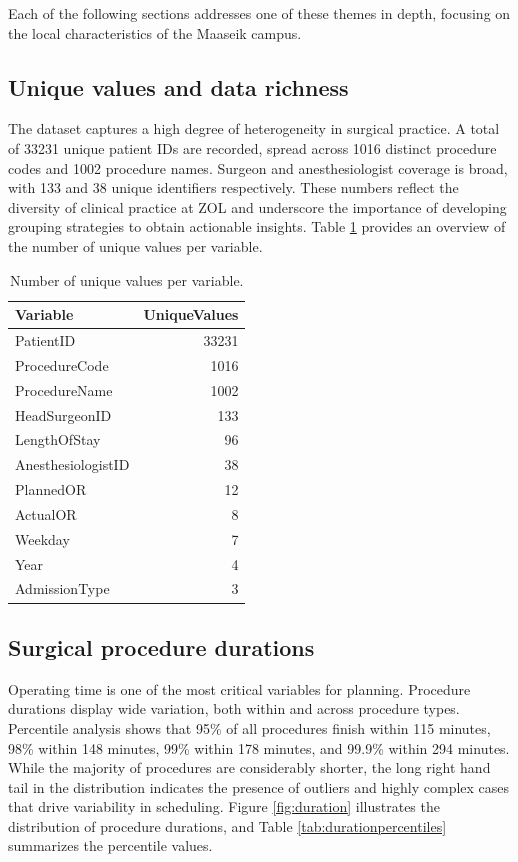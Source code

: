 \documentclass[
]{article}
\begin{document}
Each of the following sections addresses one of these themes in depth,
focusing on the local characteristics of the Maaseik campus.

\subsection{Unique values and data
richness}\label{unique-values-and-data-richness}

The dataset captures a high degree of heterogeneity in surgical
practice. A total of 33231 unique patient IDs are recorded, spread
across 1016 distinct procedure codes and 1002 procedure names. Surgeon
and anesthesiologist coverage is broad, with 133 and 38 unique
identifiers respectively. These numbers reflect the diversity of
clinical practice at ZOL and underscore the importance of developing
grouping strategies to obtain actionable insights. Table
\ref{tab:uniquevalues} provides an overview of the number of unique
values per variable.

\begin{table}[H]

\caption{\label{tab:unique values}Number of unique values per variable. \label{tab:uniquevalues}}
\centering
\begin{tabular}[t]{lr}
\toprule
Variable & UniqueValues\\
\midrule
PatientID & 33231\\
ProcedureCode & 1016\\
ProcedureName & 1002\\
HeadSurgeonID & 133\\
LengthOfStay & 96\\
\addlinespace
AnesthesiologistID & 38\\
PlannedOR & 12\\
ActualOR & 8\\
Weekday & 7\\
Year & 4\\
\addlinespace
AdmissionType & 3\\
\bottomrule
\end{tabular}
\end{table}

\subsection{Surgical procedure
durations}\label{surgical-procedure-durations}

Operating time is one of the most critical variables for planning.
Procedure durations display wide variation, both within and across
procedure types. Percentile analysis shows that 95\% of all procedures
finish within 115 minutes, 98\% within 148 minutes, 99\% within 178
minutes, and 99.9\% within 294 minutes. While the majority of procedures
are considerably shorter, the long right hand tail in the distribution
indicates the presence of outliers and highly complex cases that drive
variability in scheduling. Figure \ref{fig:duration} illustrates the
distribution of procedure durations, and Table
\ref{tab:durationpercentiles} summarizes the percentile values.
\end{document}

